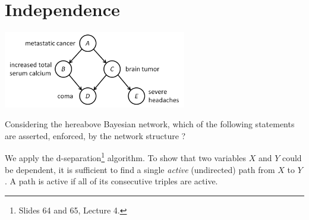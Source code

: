\documentclass[11pt, a4paper]{article}
\begin{document}
\newpage

\section{Independence}

\begin{center}
    \includegraphics[width=0.6\textwidth]{figures/e3_independence.png}
\end{center}

Considering the hereabove Bayesian network, which of the following statements are asserted, \ie{} enforced, by the network structure ?

\begin{solution}
    We apply the d-separation\footnote{Slides 64 and 65, Lecture 4.} algorithm. To show that two variables $X$ and $Y$ could be dependent, it is sufficient to find a single \emph{active} (undirected) path from $X$ to $Y$. A path is active if all of its consecutive triples are active.
\end{solution}
\end{document}
